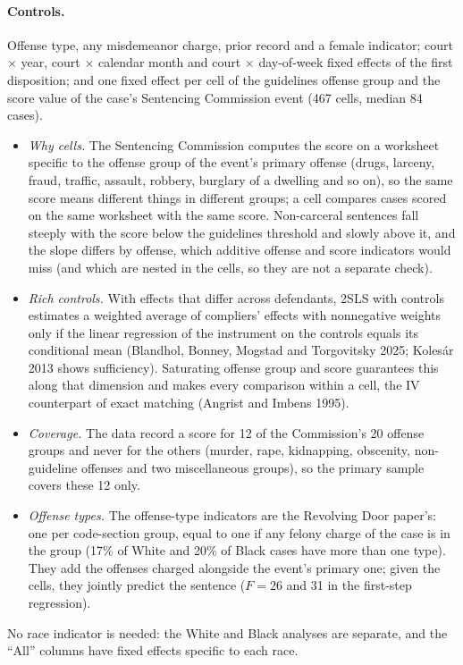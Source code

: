 \documentclass[11pt]{article}
\begin{document}
\paragraph{Controls.} Offense type, any misdemeanor charge, prior record and a female indicator; court $\times$ year, court $\times$ calendar month and court $\times$ day-of-week fixed effects of the first disposition; and one fixed effect per cell of the guidelines offense group and the score value of the case's Sentencing Commission event (467 cells, median 84 cases).
\begin{itemize}
  \item \emph{Why cells.} The Sentencing Commission computes the score on a worksheet specific to the offense group of the event's primary offense (drugs, larceny, fraud, traffic, assault, robbery, burglary of a dwelling and so on), so the same score means different things in different groups; a cell compares cases scored on the same worksheet with the same score. Non-carceral sentences fall steeply with the score below the guidelines threshold and slowly above it, and the slope differs by offense, which additive offense and score indicators would miss (and which are nested in the cells, so they are not a separate check).
  \item \emph{Rich controls.} With effects that differ across defendants, 2SLS with controls estimates a weighted average of compliers' effects with nonnegative weights only if the linear regression of the instrument on the controls equals its conditional mean (Blandhol, Bonney, Mogstad and Torgovitsky 2025; Kolesár 2013 shows sufficiency). Saturating offense group and score guarantees this along that dimension and makes every comparison within a cell, the IV counterpart of exact matching (Angrist and Imbens 1995).
  \item \emph{Coverage.} The data record a score for 12 of the Commission's 20 offense groups and never for the others (murder, rape, kidnapping, obscenity, non-guideline offenses and two miscellaneous groups), so the primary sample covers these 12 only.
  \item \emph{Offense types.} The offense-type indicators are the Revolving Door paper's: one per code-section group, equal to one if any felony charge of the case is in the group (17\% of White and 20\% of Black cases have more than one type). They add the offenses charged alongside the event's primary one; given the cells, they jointly predict the sentence ($F = 26$ and 31 in the first-step regression).
\end{itemize}
No race indicator is needed: the White and Black analyses are separate, and the ``All'' columns have fixed effects specific to each race.
\end{document}
